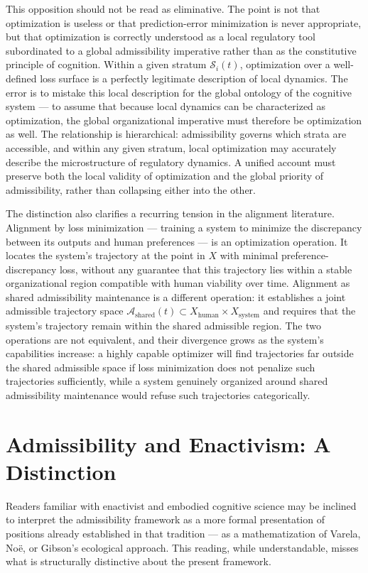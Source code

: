 \documentclass[12pt,a4paper]{report}
\theoremstyle{flyxion}
\begin{document}
This opposition should not be read as eliminative. The point is not that optimization is useless or that prediction-error minimization is never appropriate, but that optimization is correctly understood as a local regulatory tool subordinated to a global admissibility imperative rather than as the constitutive principle of cognition. Within a given stratum $\mathcal{S}_i(t)$, optimization over a well-defined loss surface is a perfectly legitimate description of local dynamics. The error is to mistake this local description for the global ontology of the cognitive system --- to assume that because local dynamics can be characterized as optimization, the global organizational imperative must therefore be optimization as well. The relationship is hierarchical: admissibility governs which strata are accessible, and within any given stratum, local optimization may accurately describe the microstructure of regulatory dynamics. A unified account must preserve both the local validity of optimization and the global priority of admissibility, rather than collapsing either into the other.

The distinction also clarifies a recurring tension in the alignment literature. Alignment by loss minimization --- training a system to minimize the discrepancy between its outputs and human preferences --- is an optimization operation. It locates the system's trajectory at the point in $X$ with minimal preference-discrepancy loss, without any guarantee that this trajectory lies within a stable organizational region compatible with human viability over time. Alignment as shared admissibility maintenance is a different operation: it establishes a joint admissible trajectory space $\mathcal{A}_{\text{shared}}(t) \subset X_{\text{human}} \times X_{\text{system}}$ and requires that the system's trajectory remain within the shared admissible region. The two operations are not equivalent, and their divergence grows as the system's capabilities increase: a highly capable optimizer will find trajectories far outside the shared admissible space if loss minimization does not penalize such trajectories sufficiently, while a system genuinely organized around shared admissibility maintenance would refuse such trajectories categorically.

\section{Admissibility and Enactivism: A Distinction}

Readers familiar with enactivist and embodied cognitive science may be inclined to interpret the admissibility framework as a more formal presentation of positions already established in that tradition --- as a mathematization of Varela, Noë, or Gibson's ecological approach. This reading, while understandable, misses what is structurally distinctive about the present framework.
\end{document}
